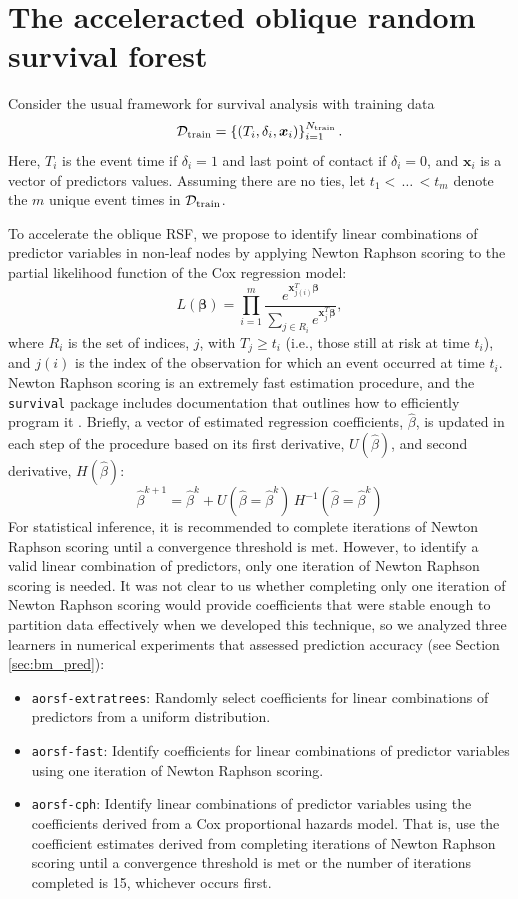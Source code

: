\documentclass[twoside,11pt]{article}\usepackage[]{graphicx}\usepackage[]{xcolor}
\newcommand{\dataset}{{\cal D}}
\newcommand{\secref}[1]{Section \ref{#1}}
\begin{document}
\section{The acceleracted oblique random survival forest}

Consider the usual framework for survival analysis with training data $$\dataset_{\text{train}} = \left\{ (T_i, \delta_i, \bm{x}_{i}) \right\}_{i=1}^{N_{\text{train}}}.$$ Here, $T_i$ is the event time if $\delta_i=1$ and last point of contact if $\delta_i=0$, and $\bm{x}_i$ is a vector of predictors values. Assuming there are no ties, let $t_1 < \, \ldots \, < t_m$ denote the $m$ unique event times in $\dataset_{\text{train}}$.

To accelerate the oblique RSF, we propose to identify linear combinations of predictor variables in non-leaf nodes by applying Newton Raphson scoring to the partial likelihood function of the Cox regression model:
\begin{equation}\label{eqn:cox-partial-likelihood}
L(\bm\beta) = \prod_{i=1}^m \frac{e^{\bm{x}_{j(i)}^T \bm\beta}}{\sum_{j \in R_i} e^{\bm{x}_j^T \bm\beta}},
\end{equation}
where $R_i$ is the set of indices, $j$, with $T_j \geq t_i$ (i.e., those still at risk at time $t_i$), and $j(i)$ is the index of the observation for which an event occurred at time $t_i$. Newton Raphson scoring is an extremely fast estimation procedure, and the \texttt{survival} package includes documentation that outlines how to efficiently program it \citep{therneau_survival_2022}. Briefly, a vector of estimated regression coefficients, $\hat{\beta}$, is updated in each step of the procedure based on its first derivative, $U(\hat{\beta})$, and second derivative, $H(\hat{\beta})$:
$$ \hat{\beta}^{k+1} =  \hat{\beta}^{k} + U(\hat{\beta} = \hat{\beta}^{k})\, H^{-1}(\hat{\beta} = \hat{\beta}^{k}) $$
For statistical inference, it is recommended to complete iterations of Newton Raphson scoring until a convergence threshold is met. However, to identify a valid linear combination of predictors, only one iteration of Newton Raphson scoring is needed. It was not clear to us whether completing only one iteration of Newton Raphson scoring would provide coefficients that were stable enough to partition data effectively when we developed this technique, so we analyzed three learners in numerical experiments that assessed prediction accuracy (see \secref{sec:bm_pred}): \begin{itemize}
\item \texttt{aorsf-extratrees}: Randomly select coefficients for linear combinations of predictors from a uniform distribution.
\item \texttt{aorsf-fast}: Identify coefficients for linear combinations of predictor variables using one iteration of Newton Raphson scoring.
\item \texttt{aorsf-cph}: Identify linear combinations of predictor variables using the coefficients derived from a Cox proportional hazards model. That is, use the coefficient estimates derived from completing iterations of Newton Raphson scoring until a convergence threshold is met or the number of iterations completed is 15, whichever occurs first.
\end{itemize}
\end{document}
